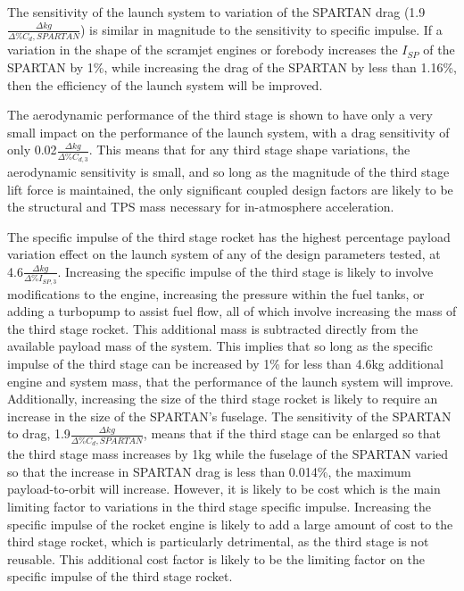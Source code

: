 The sensitivity of the launch system to variation of the SPARTAN drag (1.9$\frac{\Delta kg}{\Delta\%C_d,{SPARTAN}}$) is similar in magnitude to the sensitivity to specific impulse. 
If a variation in the shape of the scramjet engines or forebody increases the $I_{SP}$ of the SPARTAN by 1\%, while increasing the drag of the SPARTAN by less than 1.16\%, then the efficiency of the launch system will be improved. 



 The aerodynamic performance of the third stage is shown to have only a very small impact on the performance of the launch system, with a drag sensitivity of only 0.02$\frac{\Delta kg}{\Delta\%C_{d,3}}$. This means that for any third stage shape variations, the aerodynamic sensitivity is small, and so long as the magnitude of the third stage lift force is maintained, the only significant coupled design factors are likely to be the structural and TPS mass necessary for in-atmosphere acceleration.
 
 The specific impulse of the third stage rocket has the highest percentage payload variation effect on the launch system of any of the design parameters tested, at 4.6$\frac{\Delta kg}{\Delta\%I_{SP,3}}$. Increasing the specific impulse of the third stage is likely to involve modifications to the engine, increasing the pressure within the fuel tanks, or adding a turbopump to assist fuel flow, all of which involve increasing the mass of the third stage rocket. 
This additional mass is subtracted directly from the available payload mass of the system. This implies that so long as the specific impulse of the third stage can be increased by 1\% for less than 4.6kg additional engine and system mass, that the performance of the launch system will improve. 
 Additionally, increasing the size of the third stage rocket is likely to require an increase in the size of the SPARTAN's fuselage. The sensitivity of the SPARTAN to drag, 1.9$\frac{\Delta kg}{\Delta\%C_d,{SPARTAN}}$, means that if the third stage can be enlarged so that the third stage mass increases by 1kg while the fuselage of the SPARTAN varied so that the increase in SPARTAN drag is less than 0.014\%, the maximum payload-to-orbit will increase. 
However, it is likely to be cost which is the main limiting factor to variations in the third stage specific impulse. 
Increasing the specific impulse of the rocket engine is likely to add a large amount of cost to the third stage rocket, which is particularly detrimental, as the third stage is not reusable. This additional cost factor is likely to be the limiting factor on the specific impulse of the third stage rocket. 







